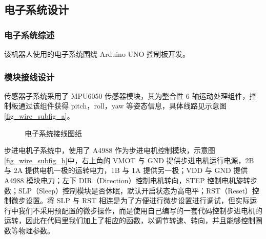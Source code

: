 \documentclass[a4paper]{ctexart}
\numberwithin{equation}{section}
\numberwithin{table}{section}
\numberwithin{figure}{section}
\begin{document}
\subsection{电子系统设计}

\subsubsection{电子系统综述}

该机器人使用的电子系统围绕 Arduino UNO 控制板开发。

\subsubsection{模块接线设计}

传感器子系统采用了 MPU6050 传感器模块，其为整合性 6 轴运动处理组件，控制板通过该组件获得 pitch，roll，yaw 等姿态信息，具体线路见示意图\ref{fig_wire_subfig_a}。

\begin{figure}[H]
  \centering
  \hfill
  \caption{电子系统接线图纸}
  \label{fig_wire}
\end{figure}


步进电机子系统中，使用了 A4988 作为步进电机控制模块，示意图\ref{fig_wire_subfig_b}中，右上角的 VMOT 与 GND 提供步进电机运行电源，2B 与 2A 提供电机一极的运转电力，1B 与 1A 提供另一极；VDD 与 GND 提供 A4988 模块电力；左下 DIR（Direction）控制电机转向，STEP 控制电机旋转步数；SLP（Sleep）控制模块是否休眠，默认开启状态为高电平；RST（Reset）控制微步设置。将 SLP 与 RST 相连是为了方便进行微步设置进行调试，但实际运行中我们不采用预配置的微步操作，而是使用自己编写的一套代码控制步进电机的运转，因此在代码里我们加上了相应的函数，以调节转速、转向，并且能够控制圈数等物理参数。
\end{document}
